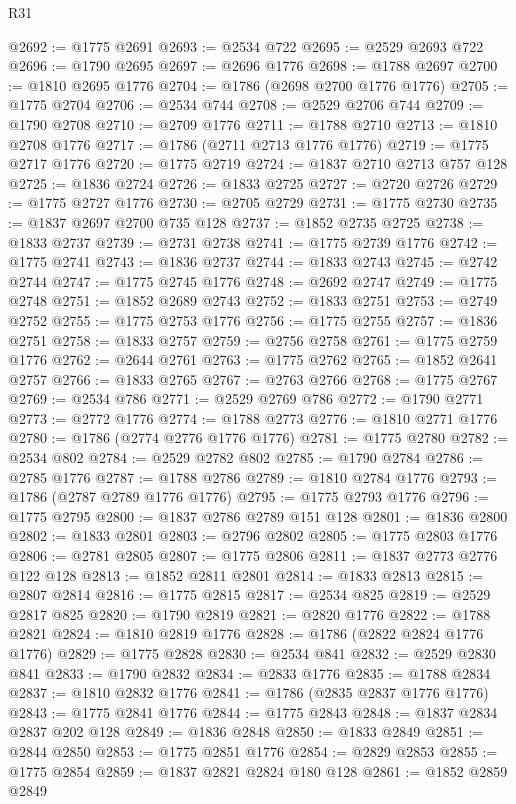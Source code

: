 \begin{lexlean}{R31}
\begin{coremodule}
@2692 := @1775 @2691
@2693 := @2534 @722
@2695 := @2529 @2693 @722
@2696 := @1790 @2695
@2697 := @2696 @1776
@2698 := @1788 @2697
@2700 := @1810 @2695 @1776
@2704 := @1786 (@2698 @2700 @1776 @1776)
@2705 := @1775 @2704
@2706 := @2534 @744
@2708 := @2529 @2706 @744
@2709 := @1790 @2708
@2710 := @2709 @1776
@2711 := @1788 @2710
@2713 := @1810 @2708 @1776
@2717 := @1786 (@2711 @2713 @1776 @1776)
@2719 := @1775 @2717 @1776
@2720 := @1775 @2719
@2724 := @1837 @2710 @2713 @757 @128
@2725 := @1836 @2724
@2726 := @1833 @2725
@2727 := @2720 @2726
@2729 := @1775 @2727 @1776
@2730 := @2705 @2729
@2731 := @1775 @2730
@2735 := @1837 @2697 @2700 @735 @128
@2737 := @1852 @2735 @2725
@2738 := @1833 @2737
@2739 := @2731 @2738
@2741 := @1775 @2739 @1776
@2742 := @1775 @2741
@2743 := @1836 @2737
@2744 := @1833 @2743
@2745 := @2742 @2744
@2747 := @1775 @2745 @1776
@2748 := @2692 @2747
@2749 := @1775 @2748
@2751 := @1852 @2689 @2743
@2752 := @1833 @2751
@2753 := @2749 @2752
@2755 := @1775 @2753 @1776
@2756 := @1775 @2755
@2757 := @1836 @2751
@2758 := @1833 @2757
@2759 := @2756 @2758
@2761 := @1775 @2759 @1776
@2762 := @2644 @2761
@2763 := @1775 @2762
@2765 := @1852 @2641 @2757
@2766 := @1833 @2765
@2767 := @2763 @2766
@2768 := @1775 @2767
@2769 := @2534 @786
@2771 := @2529 @2769 @786
@2772 := @1790 @2771
@2773 := @2772 @1776
@2774 := @1788 @2773
@2776 := @1810 @2771 @1776
@2780 := @1786 (@2774 @2776 @1776 @1776)
@2781 := @1775 @2780
@2782 := @2534 @802
@2784 := @2529 @2782 @802
@2785 := @1790 @2784
@2786 := @2785 @1776
@2787 := @1788 @2786
@2789 := @1810 @2784 @1776
@2793 := @1786 (@2787 @2789 @1776 @1776)
@2795 := @1775 @2793 @1776
@2796 := @1775 @2795
@2800 := @1837 @2786 @2789 @151 @128
@2801 := @1836 @2800
@2802 := @1833 @2801
@2803 := @2796 @2802
@2805 := @1775 @2803 @1776
@2806 := @2781 @2805
@2807 := @1775 @2806
@2811 := @1837 @2773 @2776 @122 @128
@2813 := @1852 @2811 @2801
@2814 := @1833 @2813
@2815 := @2807 @2814
@2816 := @1775 @2815
@2817 := @2534 @825
@2819 := @2529 @2817 @825
@2820 := @1790 @2819
@2821 := @2820 @1776
@2822 := @1788 @2821
@2824 := @1810 @2819 @1776
@2828 := @1786 (@2822 @2824 @1776 @1776)
@2829 := @1775 @2828
@2830 := @2534 @841
@2832 := @2529 @2830 @841
@2833 := @1790 @2832
@2834 := @2833 @1776
@2835 := @1788 @2834
@2837 := @1810 @2832 @1776
@2841 := @1786 (@2835 @2837 @1776 @1776)
@2843 := @1775 @2841 @1776
@2844 := @1775 @2843
@2848 := @1837 @2834 @2837 @202 @128
@2849 := @1836 @2848
@2850 := @1833 @2849
@2851 := @2844 @2850
@2853 := @1775 @2851 @1776
@2854 := @2829 @2853
@2855 := @1775 @2854
@2859 := @1837 @2821 @2824 @180 @128
@2861 := @1852 @2859 @2849

\end{coremodule}
\end{lexlean}
